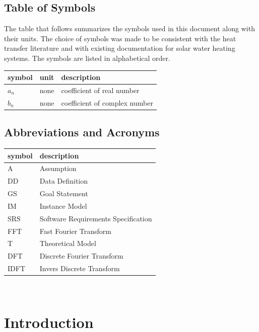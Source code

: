 \documentclass[12pt]{article}
\newcommand{\famname}{FFT} %
\begin{document}
\subsection{Table of Symbols}

The table that follows summarizes the symbols used in this document along with
their units.  The choice of symbols was made to be consistent with the heat
transfer literature and with existing documentation for solar water heating
systems.  The symbols are listed in alphabetical order.

\renewcommand{\arraystretch}{1.2}
\noindent \begin{longtable*}{l l p{12cm}} \toprule
\textbf{symbol} & \textbf{unit} & \textbf{description}\\
\midrule 
$a_n$ & none & coefficient of real number
\\
$b_n$ &none &coefficient of complex number
\\ 
\bottomrule
\end{longtable*}


\subsection{Abbreviations and Acronyms}

\renewcommand{\arraystretch}{1.2}
\begin{tabular}{l l} 
  \toprule		
  \textbf{symbol} & \textbf{description}\\
  \midrule 
  A & Assumption\\
  DD & Data Definition\\
  GS & Goal Statement\\
  IM & Instance Model\\
  SRS & Software Requirements Specification\\
  \famname{} & Fast Fourier Transform\\
  T & Theoretical Model\\
  DFT & Discrete Fourier Transform\\
  IDFT & Invers Discrete Transform\\
  \bottomrule
\end{tabular}\\


\section{Introduction}
\end{document}
